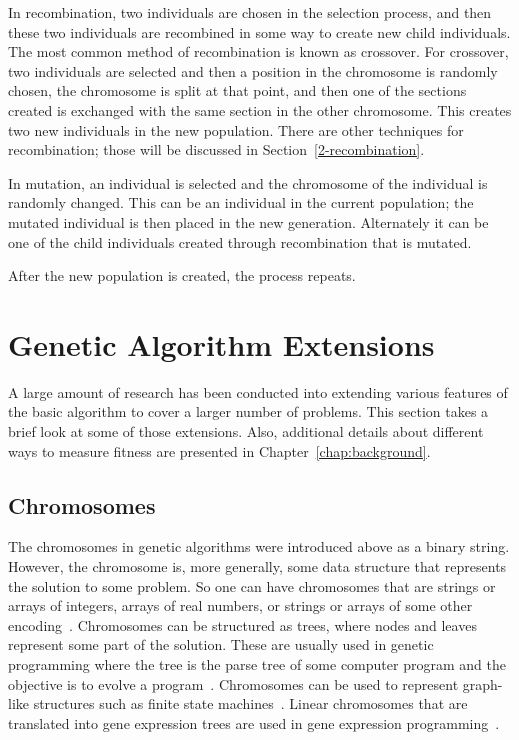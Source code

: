 In recombination, two individuals are chosen in the selection process, and then
these two individuals are recombined in some way to create new child
individuals. The most common method of recombination is known as crossover. For
crossover, two individuals are selected and then a position in the chromosome is
randomly chosen, the chromosome is split at that point, and then one of the
sections created is exchanged with the same section in the other chromosome.
This creates two new individuals in the new population. There are other
techniques for recombination; those will be discussed in
Section~\ref{2-recombination}.

In mutation, an individual is selected and the chromosome of the individual is
randomly changed. This can be an individual in the current population; the
mutated individual is then placed in the new generation. Alternately it can be
one of the child individuals created through recombination that is mutated.

After the new population is created, the process repeats.

\section{Genetic Algorithm Extensions}

A large amount of research has been conducted into extending various features of
the basic algorithm to cover a larger number of problems. This section takes a
brief look at some of those extensions. Also, additional details about different
ways to measure fitness are presented in Chapter~\ref{chap:background}.

\subsection{Chromosomes}

The chromosomes in genetic algorithms were introduced above as a binary string.
However, the chromosome is, more generally, some data structure that represents
the solution to some problem. So one can have chromosomes that are strings or
arrays of integers, arrays of real numbers, or strings or arrays of some other
encoding~\cite{haupt2004practical}. Chromosomes can be structured as trees,
where nodes and leaves represent some part of the solution. These are usually
used in genetic programming where the tree is the parse tree of some computer
program and the objective is to evolve a program~\cite{koza1992genetic}.
Chromosomes can be used to represent graph-like structures such as finite state
machines~\cite{fogel1999intelligence,fogel2000evolutionary}. Linear chromosomes
that are translated into gene expression trees are used in gene expression
programming~\cite{ferreira2012gene}.

